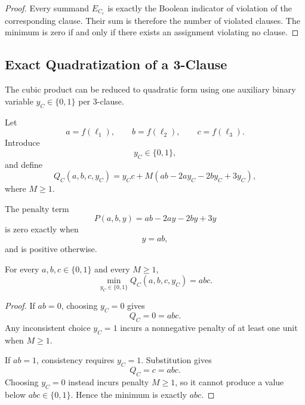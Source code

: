\begin{proof}
Every summand $E_{C_r}$ is exactly the Boolean indicator of violation of the
corresponding clause. Their sum is therefore the number of violated clauses.
The minimum is zero if and only if there exists an assignment violating no
clause.
\end{proof}

\subsection{Exact Quadratization of a 3-Clause}

The cubic product can be reduced to quadratic form using one auxiliary binary
variable $y_C\in\{0,1\}$ per 3-clause.

Let
\begin{equation}
a=f(\ell_1),\qquad
b=f(\ell_2),\qquad
c=f(\ell_3).
\end{equation}
Introduce
\begin{equation}
y_C\in\{0,1\},
\end{equation}
and define
\begin{equation}
\boxed{
Q_C(a,b,c,y_C)
=
y_Cc
+
M\left(
ab-2ay_C-2by_C+3y_C
\right),
}
\label{eq:clause-qubo}
\end{equation}
where $M\geq 1$.

The penalty term
\begin{equation}
P(a,b,y)
=
ab-2ay-2by+3y
\end{equation}
is zero exactly when
\begin{equation}
y=ab,
\end{equation}
and is positive otherwise.

\begin{theorem}
\label{thm:exact-qubo-clause}
For every $a,b,c\in\{0,1\}$ and every $M\geq1$,
\begin{equation}
\boxed{
\min_{y_C\in\{0,1\}}
Q_C(a,b,c,y_C)
=
abc.
}
\end{equation}
\end{theorem}

\begin{proof}
If $ab=0$, choosing $y_C=0$ gives
\begin{equation}
Q_C=0=abc.
\end{equation}
Any inconsistent choice $y_C=1$ incurs a nonnegative penalty of at least one
unit when $M\geq1$.

If $ab=1$, consistency requires $y_C=1$. Substitution gives
\begin{equation}
Q_C=c=abc.
\end{equation}
Choosing $y_C=0$ instead incurs penalty $M\geq1$, so it cannot produce a value
below $abc\in\{0,1\}$. Hence the minimum is exactly $abc$.
\end{proof}

